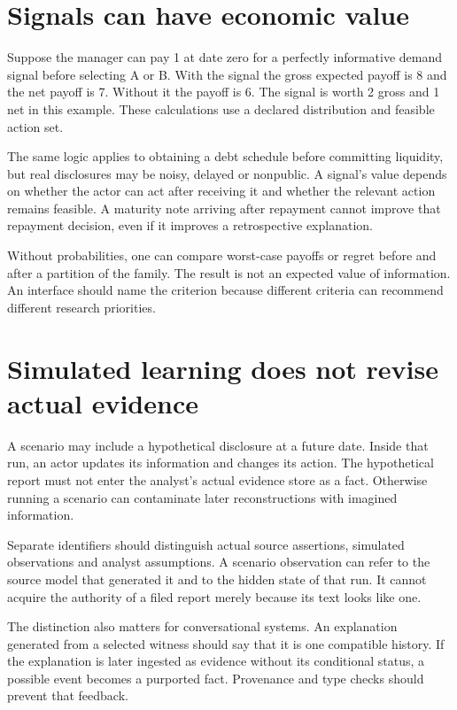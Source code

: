\section{Signals can have economic value}
Suppose the manager can pay 1 at date zero for a perfectly informative demand signal before selecting A or B. With the signal the gross expected payoff is 8 and the net payoff is 7. Without it the payoff is 6. The signal is worth 2 gross and 1 net in this example. These calculations use a declared distribution and feasible action set.

The same logic applies to obtaining a debt schedule before committing liquidity, but real disclosures may be noisy, delayed or nonpublic. A signal's value depends on whether the actor can act after receiving it and whether the relevant action remains feasible. A maturity note arriving after repayment cannot improve that repayment decision, even if it improves a retrospective explanation.

Without probabilities, one can compare worst-case payoffs or regret before and after a partition of the family. The result is not an expected value of information. An interface should name the criterion because different criteria can recommend different research priorities.

\section{Simulated learning does not revise actual evidence}
A scenario may include a hypothetical disclosure at a future date. Inside that run, an actor updates its information and changes its action. The hypothetical report must not enter the analyst's actual evidence store as a fact. Otherwise running a scenario can contaminate later reconstructions with imagined information.

Separate identifiers should distinguish actual source assertions, simulated observations and analyst assumptions. A scenario observation can refer to the source model that generated it and to the hidden state of that run. It cannot acquire the authority of a filed report merely because its text looks like one.

The distinction also matters for conversational systems. An explanation generated from a selected witness should say that it is one compatible history. If the explanation is later ingested as evidence without its conditional status, a possible event becomes a purported fact. Provenance and type checks should prevent that feedback.

